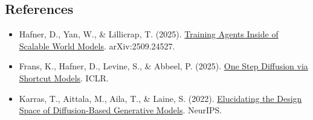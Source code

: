 \FloatBarrier
{}
\hypertarget{references-143}{%
\subsection{References}\label{references-143}}

\vspace{0.25em}
\begin{itemize}
\tightlist
\item
  Hafner, D., Yan, W., \& Lillicrap, T. (2025). \href{https://arxiv.org/abs/2509.24527}{Training Agents Inside of Scalable World Models}. arXiv:2509.24527.
\item
  Frans, K., Hafner, D., Levine, S., \& Abbeel, P. (2025). \href{https://arxiv.org/abs/2410.12557}{One Step Diffusion via Shortcut Models}. ICLR.
\item
  Karras, T., Aittala, M., Aila, T., \& Laine, S. (2022). \href{https://arxiv.org/abs/2206.00364}{Elucidating the Design Space of Diffusion-Based Generative Models}. NeurIPS.
\end{itemize}

\clearpage
